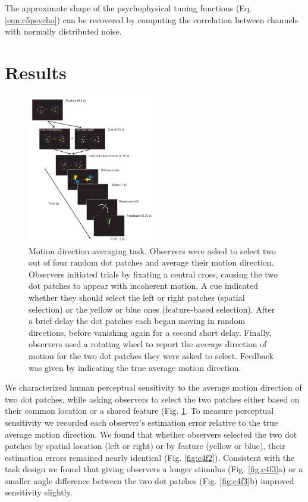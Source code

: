 The approximate shape of the psychophysical tuning functions (Eq. \ref{eqn:c5psycho}) can be recovered by computing the correlation between channels with normally distributed noise. 

\section{Results}

\begin{figure}
\centering
\includegraphics[keepaspectratio,width=0.5\textwidth]{figs_c4/f1_task.pdf}
\caption[Averaging task]{Motion direction averaging task. Observers were asked to select two out of four random dot patches and average their motion direction. Observers initiated trials by fixating a central cross, causing the two dot patches to appear with incoherent motion. A cue indicated whether they should select the left or right patches (spatial selection) or the yellow or blue ones (feature-based selection). After a brief delay the dot patches each began moving in random directions, before vanishing again for a second short delay. Finally, observers used a rotating wheel to report the \textit{average} direction of motion for the two dot patches they were asked to select. Feedback was given by indicating the true average motion direction.}
\label{fig:c4f1}
\end{figure}

We characterized human perceptual sensitivity to the average motion direction of two dot patches, while asking observers to select the two patches either based on their common location or a shared feature (Fig. \ref{fig:c4f1}. To measure perceptual sensitivity we recorded each observer's estimation error relative to the true average motion direction. We found that whether observers selected the two dot patches by spatial location (left or right) or by feature (yellow or blue), their estimation errors remained nearly identical (Fig. \ref{fig:c4f2}). Consistent with the task design we found that giving observers a longer stimulus (Fig. \ref{fig:c4f3}a) or a smaller angle difference between the two dot patches (Fig. \ref{fig:c4f3}b) improved sensitivity slightly. 

